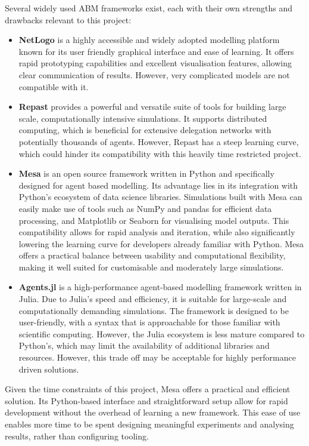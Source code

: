 Several widely used ABM frameworks exist, each with their own strengths and drawbacks relevant to this project:
\begin{itemize}
  \item \textbf{NetLogo} \citep{netlogo} is a highly accessible and widely adopted modelling platform known for its user friendly graphical interface and ease of learning. It offers rapid prototyping capabilities and excellent visualisation features, allowing clear communication of results. However, very complicated models are not compatible with it.
  \item \textbf{Repast} \citep{repast} provides a powerful and versatile suite of tools for building large scale, computationally intensive simulations. It supports distributed computing, which is beneficial for extensive delegation networks with potentially thousands of agents. However, Repast has a steep learning curve, which could hinder its compatibility with this heavily time restricted project.
  \item \textbf{Mesa} \citep{kazil_utilizing_2020} is an open source framework written in Python and specifically designed for agent based modelling. Its advantage lies in its integration with Python's ecosystem of data science libraries. Simulations built with Mesa can easily make use of tools such as NumPy and pandas for efficient data processing, and Matplotlib or Seaborn for visualising model outputs. This compatibility allows for rapid analysis and iteration, while also significantly lowering the learning curve for developers already familiar with Python. Mesa offers a practical balance between usability and computational flexibility, making it well suited for customisable and moderately large simulations.
  \item \textbf{Agents.jl} \citep{agentsjl} is a high-performance agent-based modelling framework written in Julia. Due to Julia's speed and efficiency, it is suitable for large-scale and computationally demanding simulations. The framework is designed to be user-friendly, with a syntax that is approachable for those familiar with scientific computing. However, the Julia ecosystem is less mature compared to Python's, which may limit the availability of additional libraries and resources. However, this trade off may be acceptable for highly performance driven solutions.
\end{itemize}
Given the time constraints of this project, Mesa offers a practical and efficient solution. Its Python-based interface and straightforward setup allow for rapid development without the overhead of learning a new framework. This ease of use enables more time to be spent designing meaningful experiments and analysing results, rather than configuring tooling.
